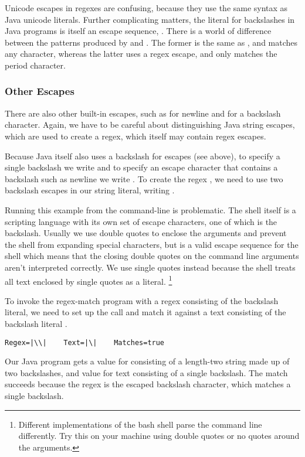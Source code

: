 Unicode escapes in regexes are confusing, because they use the same
syntax as Java unicode literals.  Further complicating matters, the
literal for backslashes in Java programs is itself an escape sequence,
\code{{\bk}{\bk}}.  There is a world of difference between the
patterns produced by  and
.  The former is the same
as , and matches any character, whereas
the latter uses a regex escape, and only matches the period
character.

\subsubsection{Other Escapes}

There are also other built-in escapes, such as  for
newline and \code{\bk\bk} for a backslash character.  Again, we have
to be careful about distinguishing Java string escapes, which are used
to create a regex, which itself may contain regex escapes.  

Because Java itself also uses a backslash for escapes (see above),
to specify a single backslash we write \code{\bk\bk} and 
to specify an escape character that contains a backslash such as newline 
 we write .  To create the regex \code{\bk\bk}, 
we need to use two backslash escapes in our string literal, writing
.  

Running this example from the command-line is problematic.
The shell itself is a scripting language with its own set of
escape characters, one of which is the backslash.
Usually we use double quotes to enclose the arguments and prevent
the shell from expanding special characters, but  is a valid escape
sequence for the shell which means that the closing double quotes on the
command line arguments aren't interpreted correctly.
We use single quotes instead because
the shell treats all text enclosed by single quotes as a literal.%
%
\footnote{Different implementations of the bash shell
parse the command line differently.  Try this on your machine
using double quotes or no quotes around the arguments.}

To invoke the regex-match program with a regex consisting 
of the backslash literal, we need to set up the call 
and match it against a text consisting of the backslash literal \code{\bk\bk}.
%
%
\begin{verbatim}
Regex=|\\|    Text=|\|    Matches=true
\end{verbatim}
%
Our Java program gets a value for  consisting of a
length-two string made up of two backslashes, and value for text
consisting of a single backslash.  The match succeeds because the
regex \code{\bk\bk} is the escaped backslash character, which matches
a single backslash.


